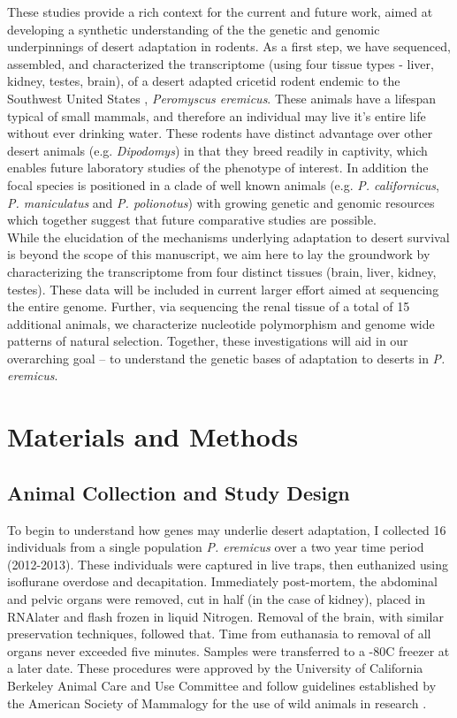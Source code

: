 \documentclass[11pt]{article}
\begin{document}
These studies provide a rich context for the current and future work, aimed at developing a synthetic understanding of the the genetic and genomic underpinnings of desert adaptation in rodents. As a first step, we have sequenced, assembled, and characterized the transcriptome (using four tissue types - liver, kidney, testes, brain), of a desert adapted cricetid rodent endemic to the Southwest United States \cite{Veal:2001vp}, \textit{Peromyscus eremicus}. These animals have a lifespan typical of small mammals, and therefore an individual may live it's entire life without ever drinking water. These rodents have distinct advantage over other desert animals (e.g. \textit{Dipodomys}) in that they breed readily in captivity, which enables future laboratory studies of the phenotype of interest. In addition the focal species is positioned in a clade of well known animals (e.g. \textit{P. californicus}, \textit{P. maniculatus} and \textit{P. polionotus}) \cite{Bradley:2007jo} with growing genetic and genomic resources \cite{Shorter:2014kw,Panhuis:2011co,Shorter:2012ib} which together suggest that future comparative studies are possible. \\

While the elucidation of the mechanisms underlying adaptation to desert survival is beyond the scope of this manuscript, we aim here to lay the groundwork by characterizing the transcriptome from four distinct tissues (brain, liver, kidney, testes). These data will be included in current larger effort aimed at sequencing the entire genome. Further, via sequencing the renal tissue of a total of 15 additional animals, we characterize nucleotide polymorphism and genome wide patterns of natural selection. Together, these investigations will aid in our overarching goal -- to understand the genetic bases of adaptation to deserts in \textit{P. eremicus}.

\section*{Materials and Methods}

\subsection*{Animal Collection and Study Design}

To begin to understand how genes may underlie desert adaptation, I collected 16 individuals from a single population \textit{P. eremicus} over a two year time period (2012-2013). These individuals were captured in live traps, then euthanized using isoflurane overdose and decapitation. Immediately post-mortem, the abdominal and pelvic organs were removed, cut in half (in the case of kidney), placed in RNAlater and flash frozen in liquid Nitrogen. Removal of the brain, with similar preservation techniques, followed that. Time from euthanasia to removal of all organs never exceeded five minutes. Samples were transferred to a -80C freezer at a later date. These procedures were approved by the University of California Berkeley Animal Care and Use Committee and follow guidelines established by the American Society of Mammalogy for the use of wild animals in research \cite{Sikes:2011dz}.  
\end{document}
